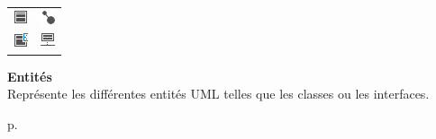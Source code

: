 \begin{minipage}[c]{.2\textwidth}
    \begin{rightborder}\begin{tabular}{cc}
        \includegraphics{images/icon/class.png} &
        \includegraphics{images/icon/interface.png} \\
        \includegraphics{images/icon/enum.png} &
        \includegraphics{images/icon/classAssoc.png} \\
    \end{tabular}\end{rightborder}
\end{minipage}
\begin{minipage}[c]{.1\textwidth}\end{minipage}
\begin{minipage}[c]{.6\textwidth}
    \textbf{Entités} \\
    Représente les différentes entités UML telles que les classes ou les interfaces.
\end{minipage}
\begin{minipage}[c]{.1\textwidth}
    \hfill
    p.{\LARGE \pageref{sec:entites}}
\end{minipage}

